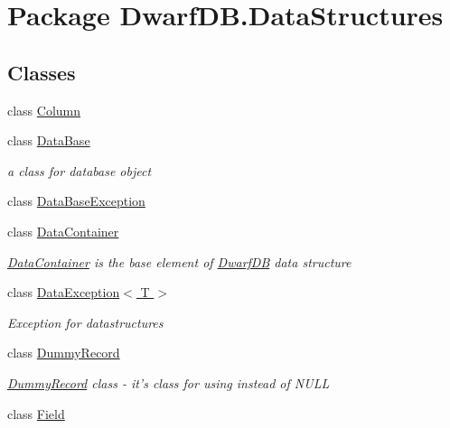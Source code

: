 \hypertarget{namespace_dwarf_d_b_1_1_data_structures}{\section{Package Dwarf\+D\+B.\+Data\+Structures}
\label{namespace_dwarf_d_b_1_1_data_structures}
}
\subsection*{Classes}
\begin{DoxyCompactItemize}
\item 
class \hyperlink{class_dwarf_d_b_1_1_data_structures_1_1_column}{Column}
\item 
class \hyperlink{class_dwarf_d_b_1_1_data_structures_1_1_data_base}{Data\+Base}
\begin{DoxyCompactList}\small\item\em a class for database object \end{DoxyCompactList}\item 
class \hyperlink{class_dwarf_d_b_1_1_data_structures_1_1_data_base_exception}{Data\+Base\+Exception}
\item 
class \hyperlink{class_dwarf_d_b_1_1_data_structures_1_1_data_container}{Data\+Container}
\begin{DoxyCompactList}\small\item\em \hyperlink{class_dwarf_d_b_1_1_data_structures_1_1_data_container}{Data\+Container} is the base element of \hyperlink{namespace_dwarf_d_b}{Dwarf\+D\+B} data structure \end{DoxyCompactList}\item 
class \hyperlink{class_dwarf_d_b_1_1_data_structures_1_1_data_exception_3_01_t_01_4}{Data\+Exception$<$ T $>$}
\begin{DoxyCompactList}\small\item\em Exception for datastructures \end{DoxyCompactList}\item 
class \hyperlink{class_dwarf_d_b_1_1_data_structures_1_1_dummy_record}{Dummy\+Record}
\begin{DoxyCompactList}\small\item\em \hyperlink{class_dwarf_d_b_1_1_data_structures_1_1_dummy_record}{Dummy\+Record} class -\/ it's class for using instead of N\+U\+L\+L \end{DoxyCompactList}\item 
class \hyperlink{class_dwarf_d_b_1_1_data_structures_1_1_field}{Field}

\end{DoxyCompactItemize}
